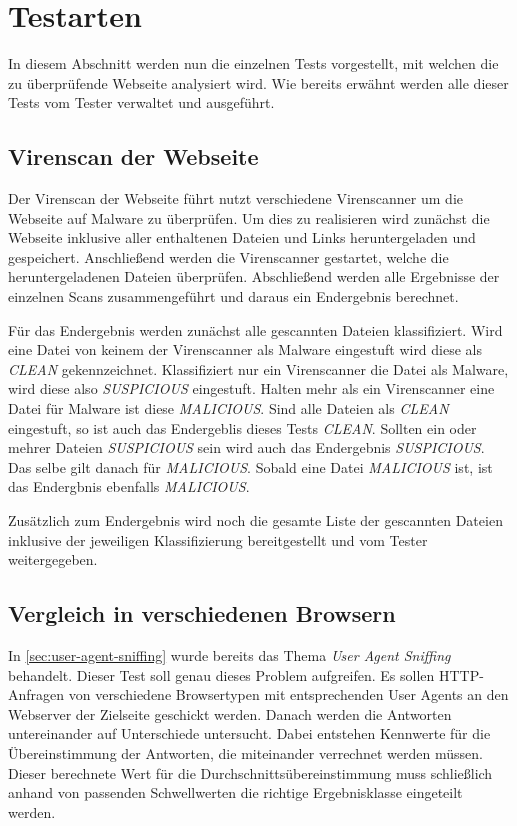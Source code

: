 \section{Testarten}
\label{sec:konzept-testarten}

In diesem Abschnitt werden nun die einzelnen Tests vorgestellt, mit welchen die zu überprüfende Webseite analysiert wird. Wie bereits erwähnt werden alle dieser Tests vom Tester verwaltet und ausgeführt.

\subsection{Virenscan der Webseite}

Der Virenscan der Webseite führt nutzt verschiedene Virenscanner um die Webseite auf Malware zu überprüfen. Um dies zu realisieren wird zunächst die Webseite inklusive aller enthaltenen Dateien und Links heruntergeladen und gespeichert. Anschließend werden die Virenscanner gestartet, welche die heruntergeladenen Dateien überprüfen. Abschließend werden alle Ergebnisse der einzelnen Scans zusammengeführt und daraus ein Endergebnis berechnet.

Für das Endergebnis werden zunächst alle gescannten Dateien klassifiziert. Wird eine Datei von keinem der Virenscanner als Malware eingestuft wird diese als \textit{CLEAN} gekennzeichnet. Klassifiziert nur ein Virenscanner die Datei als Malware, wird diese also \textit{SUSPICIOUS} eingestuft. Halten mehr als ein Virenscanner eine Datei für Malware ist diese \textit{MALICIOUS}. Sind alle Dateien als \textit{CLEAN} eingestuft, so ist auch das Endergeblis dieses Tests \textit{CLEAN}. Sollten ein oder mehrer Dateien \textit{SUSPICIOUS} sein wird auch das Endergebnis \textit{SUSPICIOUS}. Das selbe gilt danach für \textit{MALICIOUS}. Sobald eine Datei \textit{MALICIOUS} ist, ist das Endergbnis ebenfalls \textit{MALICIOUS}.

Zusätzlich zum Endergebnis wird noch die gesamte Liste der gescannten Dateien inklusive der jeweiligen Klassifizierung bereitgestellt und vom Tester weitergegeben.

\subsection{Vergleich in verschiedenen Browsern}

In \autoref{sec:user-agent-sniffing} wurde bereits das Thema \textit{User Agent Sniffing} behandelt.
Dieser Test soll genau dieses Problem aufgreifen.
Es sollen \ac{HTTP}-Anfragen von verschiedene Browsertypen mit entsprechenden User Agents an den Webserver der Zielseite geschickt werden.
Danach werden die Antworten untereinander auf Unterschiede untersucht. Dabei entstehen Kennwerte für die Übereinstimmung der Antworten, die miteinander verrechnet werden müssen.
Dieser berechnete Wert für die Durchschnittsübereinstimmung muss schließlich anhand von passenden Schwellwerten die richtige Ergebnisklasse eingeteilt werden.

